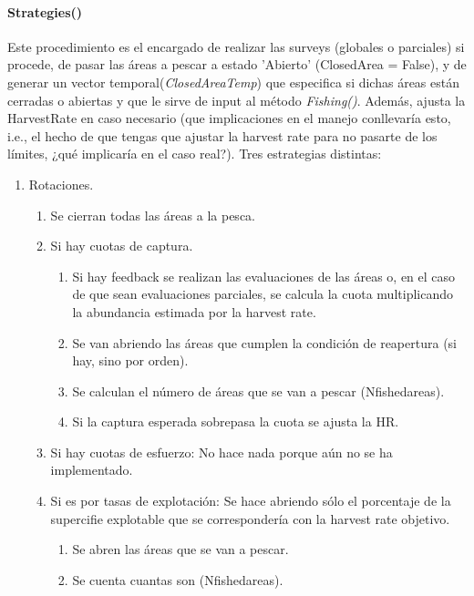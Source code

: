 \documentclass[12pt, oneside, a4paper]{article}
\begin{document}
			\paragraph{Strategies()}
			Este procedimiento es el encargado de realizar las surveys (globales o parciales) si procede, de pasar las áreas a pescar a estado 'Abierto' (ClosedArea = False), y de generar un vector temporal(\emph{ClosedAreaTemp}) que especifica si dichas áreas están cerradas o abiertas y que le sirve de input al método \emph{Fishing()}. Además, ajusta la HarvestRate en caso necesario (que implicaciones en el manejo conllevaría esto, i.e., el hecho de que tengas que ajustar la harvest rate para no pasarte de los límites, ¿qué implicaría en el caso real?).
				Tres estrategias distintas:
					\begin{enumerate}
						\item Rotaciones. 
							\begin{enumerate}
								\item Se cierran todas las áreas a la pesca. 
								\item Si hay cuotas de captura.
									\begin{enumerate}
										\item Si hay feedback se realizan las evaluaciones de las áreas o, en el caso de que sean evaluaciones parciales, se calcula la cuota multiplicando la abundancia estimada por la harvest rate.
										\item Se van abriendo las áreas que cumplen la condición de reapertura (si hay, sino por orden).
										\item Se calculan el número de áreas que se van a pescar (Nfishedareas).
										\item Si la captura esperada sobrepasa la cuota se ajusta la HR. 
									\end{enumerate}
								\item Si hay cuotas de esfuerzo: No hace nada porque aún no se ha implementado. 
								\item Si es por tasas de explotación: Se hace abriendo sólo el porcentaje de la supercifie explotable que se correspondería con la harvest rate objetivo. 
								\begin{enumerate}
									\item Se abren las áreas que se van a pescar.
									\item Se cuenta cuantas son (Nfishedareas).
								\end{enumerate}
							\end{enumerate}

\end{enumerate}
\end{document}
